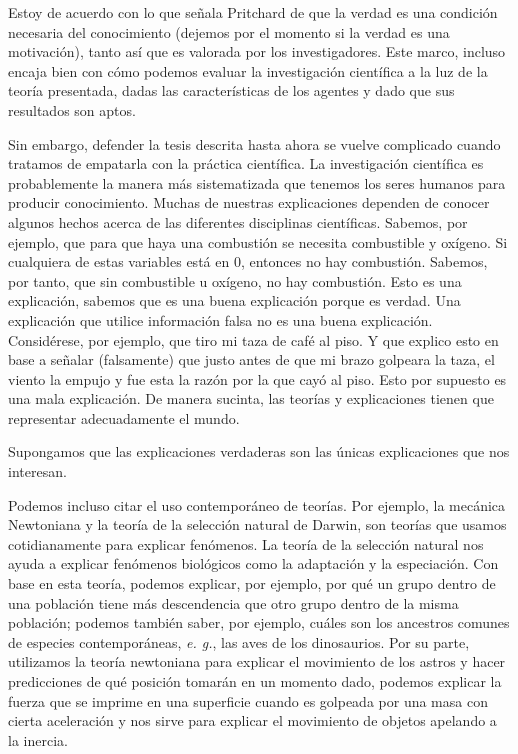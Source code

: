 \documentclass[12pt]{article}
\begin{document}
Estoy de acuerdo con lo que señala Pritchard de que la verdad es una condición necesaria del conocimiento (dejemos por el momento si la verdad es una motivación), tanto así que es valorada por los investigadores. Este marco, incluso encaja bien con cómo podemos evaluar la investigación científica a la luz de la teoría presentada, dadas las características de los agentes y dado que sus resultados son aptos. 

Sin embargo, defender la tesis descrita hasta ahora se vuelve complicado cuando tratamos de empatarla con la práctica científica. La investigación científica es probablemente la manera más sistematizada que tenemos los seres humanos para producir conocimiento. Muchas de nuestras explicaciones dependen de conocer algunos hechos acerca de las diferentes disciplinas científicas. Sabemos, por ejemplo, que para que haya una combustión se necesita combustible y oxígeno. Si cualquiera de estas variables está en 0, entonces no hay combustión. Sabemos, por tanto, que sin combustible u oxígeno, no hay combustión. Esto es una explicación, sabemos que es una buena explicación porque es verdad. Una explicación que utilice información falsa no es una buena explicación. Considérese, por ejemplo, que tiro mi taza de café al piso. Y que explico esto en base a señalar (falsamente) que justo antes de que mi brazo golpeara la taza, el viento la empujo y fue esta la razón por la que cayó al piso. Esto por supuesto es una mala explicación. De manera sucinta, las teorías y explicaciones tienen que representar adecuadamente el mundo.

Supongamos que las explicaciones verdaderas son las únicas explicaciones que nos interesan. 

Podemos incluso citar el uso contemporáneo de teorías. Por ejemplo, la mecánica Newtoniana y la teoría de la selección natural de Darwin, son teorías que usamos cotidianamente para explicar fenómenos. La teoría de la selección natural nos ayuda a explicar fenómenos biológicos como la adaptación y la especiación. Con base en esta teoría, podemos explicar, por ejemplo, por qué un grupo dentro de una población tiene más descendencia que otro grupo dentro de la misma población; podemos también saber, por ejemplo, cuáles son los ancestros comunes de especies contemporáneas, \textit{e. g.}, las aves de los dinosaurios. Por su parte, utilizamos la teoría newtoniana para explicar el movimiento de los astros y hacer predicciones de qué posición tomarán en un momento dado, podemos explicar la fuerza que se imprime en una superficie cuando es golpeada por una masa con cierta aceleración y nos sirve para explicar el movimiento de objetos apelando a la inercia.
\end{document}
